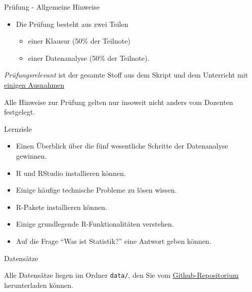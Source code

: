 \documentclass[10pt,ngerman,ignorenonframetext,]{beamer}
\providecommand{\tightlist}{%
  \setlength{\itemsep}{0pt}\setlength{\parskip}{0pt}}
\begin{document}
\begin{frame}{Prüfung - Allgemeine Hinweise}

\begin{itemize}
\tightlist
\item
  Die Prüfung besteht aus zwei Teilen

  \begin{itemize}
  \tightlist
  \item
    einer Klausur (50\% der Teilnote)
  \item
    einer Datenanalyse (50\% der Teilnote).
  \end{itemize}
\end{itemize}

\emph{Prüfungsrelevant} ist der gesamte Stoff aus dem Skript und dem
Unterricht mit
\href{https://sebastiansauer.github.io/Praxis_der_Datenanalyse/organisatorisches.html\#prufung}{einigen
Ausnahmen}

Alle Hinweise zur Prüfung gelten nur insoweit nicht anders vom Dozenten
festgelegt.

\end{frame}

\begin{frame}{Lernziele}

\begin{itemize}
\tightlist
\item
  Einen Überblick über die fünf wesentliche Schritte der Datenanalyse
  gewinnen.
\item
  R und RStudio installieren können.
\item
  Einige häufige technische Probleme zu lösen wissen.
\item
  R-Pakete installieren können.
\item
  Einige grundlegende R-Funktionalitäten verstehen.
\item
  Auf die Frage ``Was ist Statistik?'' eine Antwort geben können.
\end{itemize}

\end{frame}

\begin{frame}[fragile]{Datensätze}

Alle Datensätze liegen im Ordner \texttt{data/}, den Sie vom
\href{https://github.com/sebastiansauer/Praxis_der_Datenanalyse}{Github-Repositorium}
herunterladen können.

\end{frame}
\end{document}

